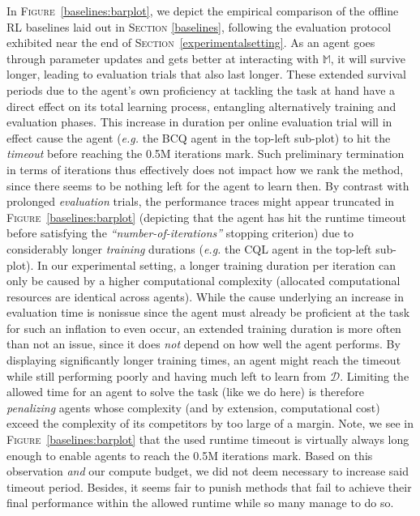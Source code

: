 In \textsc{Figure}~\ref{baselines:barplot},
we depict the empirical comparison of the offline RL baselines laid out in \textsc{Section} \ref{baselines},
following the evaluation protocol exhibited near the end of \textsc{Section}~\ref{experimentalsetting}.
As an agent goes through parameter updates and gets better at interacting with $\mathbb{M}$,
it will survive longer, leading to evaluation trials that also last longer.
These extended survival periods due to the agent's own proficiency at tackling the task at hand have a direct effect
on its total learning process, entangling alternatively training and evaluation phases.
This increase in duration per online evaluation trial will in effect cause the agent (\textit{e.g.} the
BCQ \cite{Fujimoto2018-mj} agent
in the top-left sub-plot)
to hit the \textit{timeout}
before reaching the 0.5M iterations mark.
Such preliminary termination in terms of iterations thus effectively does not impact how we rank the method,
since there seems to be nothing left for the agent to learn then.
By contrast with prolonged \emph{evaluation} trials,
the performance traces might appear truncated in \textsc{Figure}~\ref{baselines:barplot}
(depicting that the agent has hit the runtime timeout before satisfying the
\textit{``number-of-iterations''} stopping criterion)
due to considerably longer \emph{training} durations (\textit{e.g.} the
CQL \cite{Kumar2020-zb} agent
in the top-left sub-plot).
In our experimental setting,
a longer training duration per iteration can only be caused by a higher computational complexity
(allocated computational resources are identical across agents).
While the cause underlying an increase in evaluation time is nonissue since the agent must already be proficient
at the task for such an inflation to even occur,
an extended training duration is more often than not an issue, since it does \emph{not} depend on how well
the agent performs.
By displaying significantly longer training times, an agent might reach the timeout while still performing poorly
and having much left to learn from $\mathcal{D}$.
Limiting the allowed time for an agent to solve the task (like we do here) is therefore \emph{penalizing}
agents whose complexity (and by extension, computational cost) exceed the complexity of its competitors
by too large of a margin.
Note, we see in \textsc{Figure}~\ref{baselines:barplot} that the used runtime timeout is virtually always long enough
to enable agents to reach the 0.5M iterations mark.
Based on this observation \emph{and} our compute budget, we did not deem necessary to increase said timeout period.
Besides, it seems fair to punish methods that fail to achieve their final performance within the allowed
runtime while so many manage to do so.

